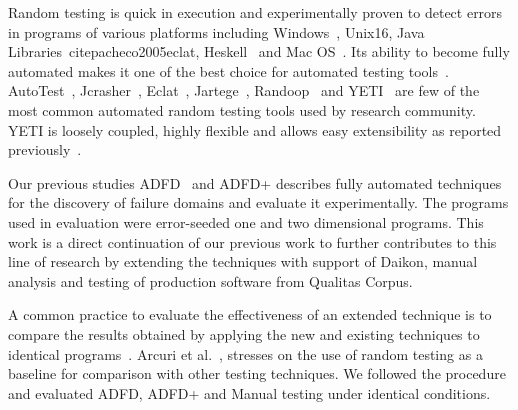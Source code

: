 \documentclass[runningheads,a4paper]{llncs}
\begin{document}
Random testing is quick in execution and experimentally proven to detect errors in programs of various platforms including Windows~\cite{forrester2000empirical}, Unix{16}, Java Libraries~cite{pacheco2005eclat}, Heskell~\cite{claessen2011quickcheck} and Mac OS~\cite{miller2006empirical}.  Its ability to become fully automated makes it one of the best choice for automated testing tools~\cite{csallner2004jcrasher}\cite{pacheco2005eclat}. AutoTest~\cite{ciupa2008predictability}, Jcrasher~\cite{csallner2004jcrasher}, Eclat~\cite{pacheco2005eclat}, Jartege~\cite{oriat2005jartege}, Randoop~\cite{pacheco2007randoop} and YETI~\cite{oriol2012random}\cite{ahmad2013adfd}\cite{ahmad2014adfd2} are few of the most common automated random testing tools used by research community. YETI is loosely coupled, highly flexible and allows easy extensibility as reported previously~\cite{oriol2010testing}. 

Our previous studies ADFD~\cite{ahmad2013adfd} and ADFD+ \cite{ahmad2014adfd2} describes fully automated techniques for the discovery of failure domains and evaluate it experimentally. The programs used in evaluation were error-seeded one and two dimensional programs. This work is a direct continuation of our previous work to further contributes to this line of research by extending the techniques with support of Daikon, manual analysis and testing of production software from Qualitas Corpus.

A common practice to evaluate the effectiveness of an extended technique is to compare the results obtained by applying the new and existing techniques to identical programs~\cite{Duran1984}\cite{Gutjahr1999}. Arcuri et al.~\cite{Arcuri2012}, stresses on the use of random testing as a baseline for comparison with other testing techniques. We followed the procedure and evaluated ADFD, ADFD+ and Manual testing under identical conditions.


\end{document}
